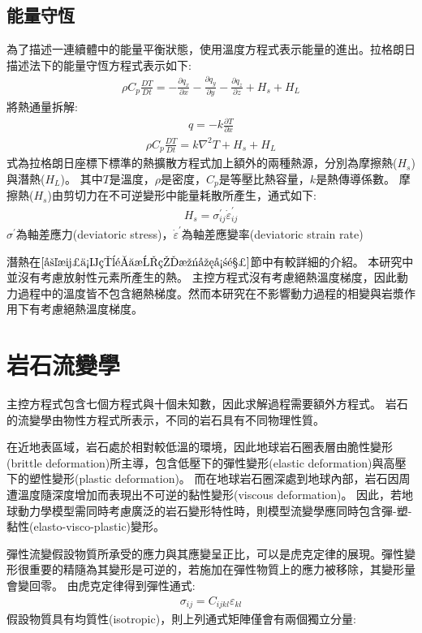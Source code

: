 \subsection{能量守恆}
為了描述一連續體中的能量平衡狀態，使用溫度方程式表示能量的進出。拉格朗日描述法下的能量守恆方程式表示如下:
\begin{align}
\rho C_p \frac{DT}{Dt} = -\frac{\partial q_x}{\partial x}-\frac{\partial q_y}{\partial y}-\frac{\partial q_z}{\partial z}+H_s+H_L
\end{align}
將熱通量拆解:
\begin{align}
q=-k\frac{\partial T}{\partial x}
\end{align}
\begin{align}
\rho C_p \frac{DT}{Dt} = k\nabla^2T+H_s+H_L
\end{align}
式為拉格朗日座標下標準的熱擴散方程式加上額外的兩種熱源，分別為摩擦熱($H_s$)與潛熱($H_L$)。
其中$T$是溫度，$\rho$是密度，$C_p$是等壓比熱容量，$k$是熱傳導係數。
摩擦熱($H_s$)由剪切力在不可逆變形中能量耗散所產生，通式如下:
\begin{align}
    H_s = \sigma^{'}_{ij}\dot\varepsilon^{'}_{ij}
\end{align}
$\sigma^{'}$為軸差應力(deviatoric stress)，$\dot\varepsilon^{'}$為軸差應變率(deviatoric strain rate)

潛熱在$\ref{岩漿作用造成的溫度影響}$節中有較詳細的介紹。
本研究中並沒有考慮放射性元素所產生的熱。
主控方程式沒有考慮絕熱溫度梯度，因此動力過程中的溫度皆不包含絕熱梯度。然而本研究在不影響動力過程的相變與岩漿作用下有考慮絕熱溫度梯度。

\section{岩石流變學}
主控方程式包含七個方程式與十個未知數，因此求解過程需要額外方程式。
岩石的流變學由物性方程式所表示，不同的岩石具有不同物理性質。

在近地表區域，岩石處於相對較低溫的環境，因此地球岩石圈表層由脆性變形(brittle deformation)所主導，包含低壓下的彈性變形(elastic deformation)與高壓下的塑性變形(plastic deformation)。
而在地球岩石圈深處到地球內部，岩石因周遭溫度隨深度增加而表現出不可逆的黏性變形(viscous deformation)。
因此，若地球動力學模型需同時考慮廣泛的岩石變形特性時，則模型流變學應同時包含彈-塑-黏性(elasto-visco-plastic)變形。

彈性流變假設物質所承受的應力與其應變呈正比，可以是虎克定律的展現。彈性變形很重要的精隨為其變形是可逆的，若施加在彈性物質上的應力被移除，其變形量會變回零。
由虎克定律得到彈性通式:
\begin{align}
\sigma_{ij}=C_{ijkl} \varepsilon_{kl}
\end{align}
假設物質具有均質性(isotropic)，則上列通式矩陣僅會有兩個獨立分量:

